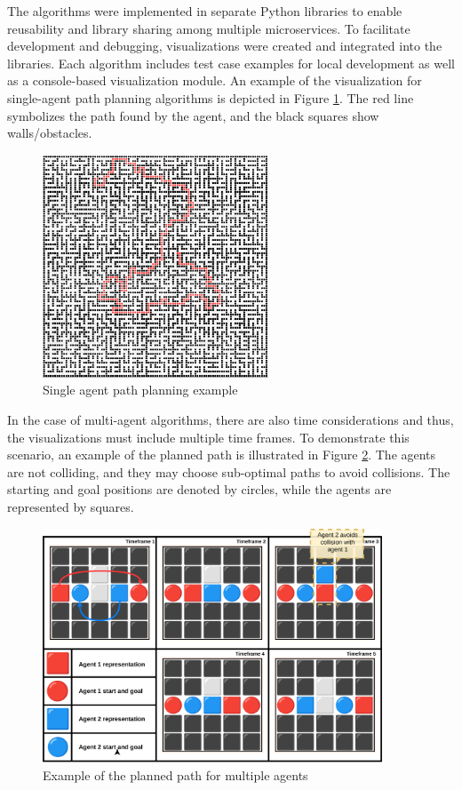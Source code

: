 The algorithms were implemented in separate Python libraries to enable reusability and library sharing among multiple microservices.  To facilitate development and debugging, visualizations were created and integrated into the libraries. Each algorithm includes test case examples for local development as well as a console-based visualization module. An example of the visualization for single-agent path planning algorithms is depicted in Figure \ref{fig:single_agent_path}. The red line symbolizes the path found by the agent, and the black squares show walls/obstacles.

\begin{figure}[H]
    \centering
    \includegraphics[width=0.6\textwidth]{pictures/single_path_maze.png}
    \caption{ Single agent path planning example} 
    \label{fig:single_agent_path}
\end{figure}


In the case of multi-agent algorithms, there are also time considerations and thus, the visualizations must include multiple time frames. To demonstrate this scenario, an example of the planned path is illustrated in Figure \ref{fig:multiple_agent_path}. The agents are not colliding, and they may choose sub-optimal paths to avoid collisions. The starting and goal positions are denoted by circles, while the agents are represented by squares.

\begin{figure}[H]
    \centering
    \includegraphics[width=0.9\textwidth]{pictures/example_planning.png}
    \caption{ Example of the planned path for multiple agents } 
    \label{fig:multiple_agent_path}
\end{figure}

